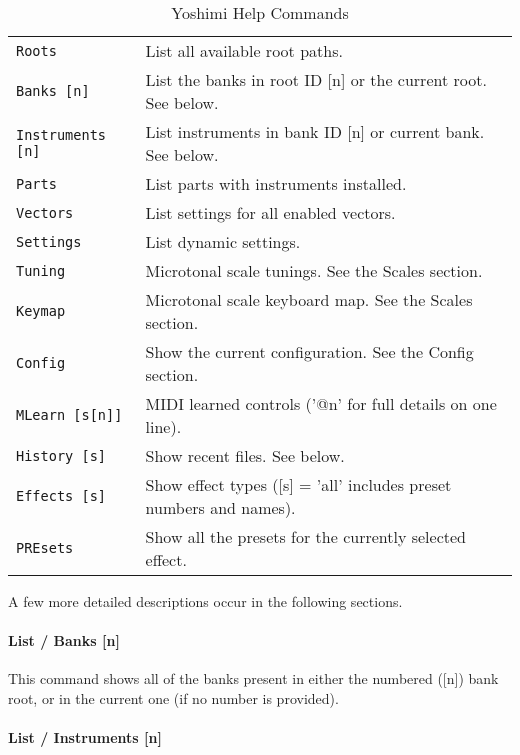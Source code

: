    \begin{table}[H]
      \centering
      \caption{Yoshimi Help Commands}
      \label{table:yoshimi_text_help_commands}
      \begin{tabular}{l l}

\texttt{Roots} &
   List all available root paths. \\
\texttt{Banks [n]} &
   List the banks in root ID [n] or the current root.  See below. \\
\texttt{Instruments [n]} &
   List instruments in bank ID [n] or current bank. See below.  \\
\texttt{Parts} &
   List parts with instruments installed. \\
\texttt{Vectors} &
   List settings for all enabled vectors. \\
\texttt{Settings} &
   List dynamic settings. \\
\texttt{Tuning} &
   Microtonal scale tunings. See the Scales section. \\
\texttt{Keymap} &
   Microtonal scale keyboard map.  See the Scales section. \\
\texttt{Config} &
   Show the current configuration. See the Config section. \\
\texttt{MLearn [s[n]]} &
   MIDI learned controls ('@n' for full details on one line). \\
\texttt{History [s]} &
   Show recent files. See below. \\
\texttt{Effects [s]} &
   Show effect types ([s] = 'all' includes preset numbers and names). \\
\texttt{PREsets} &
   Show all the presets for the currently selected effect. \\

      \end{tabular}
   \end{table}

A few more detailed descriptions occur in the following sections.

\paragraph{List / Banks [n]}
\label{paragraph:command_line_list_banks}

   This command shows all of the banks present in either the numbered ([n])
   bank root, or in the current one (if no number is provided).

\paragraph{List / Instruments [n]}
\label{paragraph:command_line_list_instruments}

